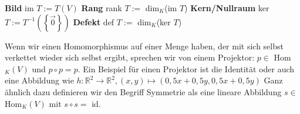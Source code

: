 \documentclass[12pt]{article}
\begin{document}
				\begin{tcolorbox}[boxsep=0pt,top=0.65cm,left=.75cm,right=.5cm, bottom=.3cm,arc=0pt,auto outer arc,colback=white,colframe=black, enlarge top by=0.25cm]
					\begin{multicols}{2}
					\textbf{Bild}\newline
					im $T:=T(V)$\newline\newline
					\textbf{Rang}\newline
					rank $T:=$ dim$_K$(im $T$)\newline\newline
					\textbf{Kern/Nullraum}\newline
					ker $T:=T^{-1}\left(\left\{\vec{0}\right\}\right)$\newline\newline
					\textbf{Defekt}\newline
					def $T:=$ dim$_K$(ker $T$)
					\end{multicols}
				\end{tcolorbox}
				\noindent Wenn wir einen Homomorphismus auf einer Menge haben, der mit sich selbst verkettet wieder sich selbst ergibt, sprechen wir von einem Projektor: $p\in$ Hom$_K(V)$ und $p\circ p =p$. Ein Beispiel für einen Projektor ist die Identität oder auch eine Abbildung wie $h:\mathbb{R}^2\to\mathbb{R}^2,(x,y)\mapsto (0,5x+0,5y,0,5x+0,5y)$\newline\newline
				Ganz ähnlich dazu definieren wir den Begriff Symmetrie als eine lineare Abbildung $s\in$ Hom$_K(V)$ mit $s\circ s=$ id.
\end{document}

